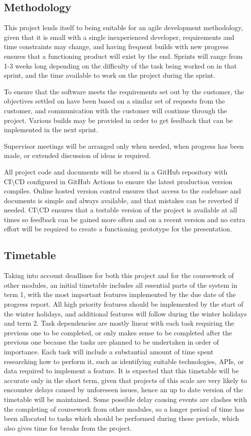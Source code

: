 \subsection{Methodology}
This project lends itself to being suitable for an agile development methodology, given that it is small with a single inexperienced developer, requirements and time constraints may change, and having frequent builds with new progress ensures that a functioning product will exist by the end. Sprints will range from 1-3 weeks long depending on the difficulty of the task being worked on in that sprint, and the time available to work on the project during the sprint. 

To ensure that the software meets the requirements set out by the customer, the objectives settled on have been based on a similar set of requests from the customer, and communication with the customer will continue through the project. Various builds may be provided in order to get feedback that can be implemented in the next sprint.

Supervisor meetings will be arranged only when needed, when progress has been made, or extended discussion of ideas is required.

All project code and documents will be stored in a GitHub repository with CI\textbackslash CD configured in GitHub Actions to ensure the latest production version compiles. Online hosted version control ensures that access to the codebase and documents is simple and always available, and that mistakes can be reverted if needed. CI\textbackslash CD ensures that a testable version of the project is available at all times so feedback can be gained more often and on a recent version and no extra effort will be required to create a functioning prototype for the presentation.

\subsection{Timetable}
Taking into account deadlines for both this project and for the coursework of other modules, an initial timetable includes all essential parts of the system in term 1, with the most important features implemented by the due date of the progress report. All high priority features should be implemented by the start of the winter holidays, and additional features will follow during the winter holidays and term 2. Task dependencies are mostly linear with each task requiring the previous one to be completed, or only makes sense to be completed after the previous one because the tasks are planned to be undertaken in order of importance. Each task will include a substantial amount of time spent researching how to perform it, such as identifying suitable technologies, APIs, or data required to implement a feature. It is expected that this timetable will be accurate only in the short term, given that projects of this scale are very likely to encounter delays caused by unforeseen issues, hence an up to date version of the timetable will be maintained. Some possible delay causing events are clashes with the completing of coursework from other modules, so a longer period of time has been allocated to tasks which should be performed during these periods, which also gives time for breaks from the project.

